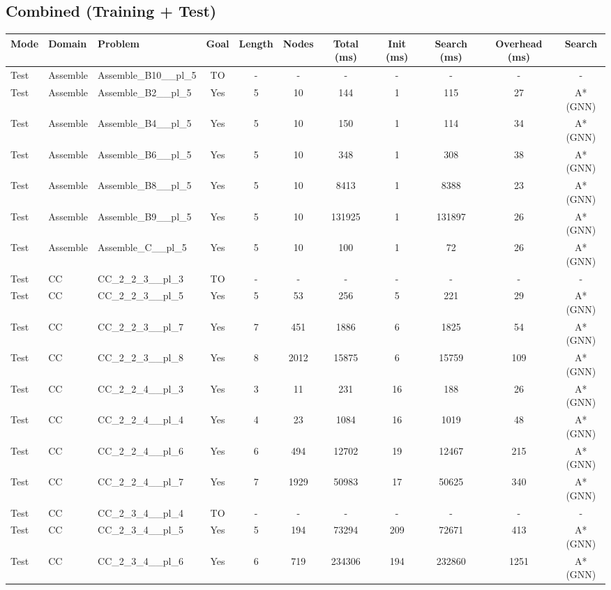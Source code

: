 \documentclass{article}
\begin{document}
\subsection*{Combined (Training + Test)}
\begin{tabular}{lllcccccccc}
\toprule
Mode & Domain & Problem & Goal & Length & Nodes & Total (ms) & Init (ms) & Search (ms) & Overhead (ms) & Search \\
\midrule
Test & Assemble & Assemble\_B10\_\_pl\_5 & TO & - & - & - & - & - & - & - \\
Test & Assemble & Assemble\_B2\_\_pl\_5 & Yes & 5 & 10 & 144 & 1 & 115 & 27 & A*(GNN) \\
Test & Assemble & Assemble\_B4\_\_pl\_5 & Yes & 5 & 10 & 150 & 1 & 114 & 34 & A*(GNN) \\
Test & Assemble & Assemble\_B6\_\_pl\_5 & Yes & 5 & 10 & 348 & 1 & 308 & 38 & A*(GNN) \\
Test & Assemble & Assemble\_B8\_\_pl\_5 & Yes & 5 & 10 & 8413 & 1 & 8388 & 23 & A*(GNN) \\
Test & Assemble & Assemble\_B9\_\_pl\_5 & Yes & 5 & 10 & 131925 & 1 & 131897 & 26 & A*(GNN) \\
Test & Assemble & Assemble\_C\_\_pl\_5 & Yes & 5 & 10 & 100 & 1 & 72 & 26 & A*(GNN) \\
Test & CC & CC\_2\_2\_3\_\_pl\_3 & TO & - & - & - & - & - & - & - \\
Test & CC & CC\_2\_2\_3\_\_pl\_5 & Yes & 5 & 53 & 256 & 5 & 221 & 29 & A*(GNN) \\
Test & CC & CC\_2\_2\_3\_\_pl\_7 & Yes & 7 & 451 & 1886 & 6 & 1825 & 54 & A*(GNN) \\
Test & CC & CC\_2\_2\_3\_\_pl\_8 & Yes & 8 & 2012 & 15875 & 6 & 15759 & 109 & A*(GNN) \\
Test & CC & CC\_2\_2\_4\_\_pl\_3 & Yes & 3 & 11 & 231 & 16 & 188 & 26 & A*(GNN) \\
Test & CC & CC\_2\_2\_4\_\_pl\_4 & Yes & 4 & 23 & 1084 & 16 & 1019 & 48 & A*(GNN) \\
Test & CC & CC\_2\_2\_4\_\_pl\_6 & Yes & 6 & 494 & 12702 & 19 & 12467 & 215 & A*(GNN) \\
Test & CC & CC\_2\_2\_4\_\_pl\_7 & Yes & 7 & 1929 & 50983 & 17 & 50625 & 340 & A*(GNN) \\
Test & CC & CC\_2\_3\_4\_\_pl\_4 & TO & - & - & - & - & - & - & - \\
Test & CC & CC\_2\_3\_4\_\_pl\_5 & Yes & 5 & 194 & 73294 & 209 & 72671 & 413 & A*(GNN) \\
Test & CC & CC\_2\_3\_4\_\_pl\_6 & Yes & 6 & 719 & 234306 & 194 & 232860 & 1251 & A*(GNN) \\

\end{tabular}
\end{document}
